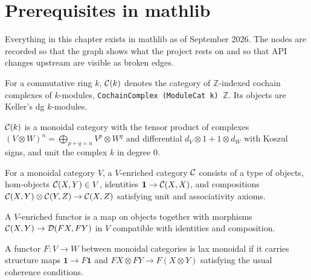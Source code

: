 \chapter{Prerequisites in mathlib}
\label{ch:prereq}

Everything in this chapter exists in mathlib as of September 2026. The nodes are recorded so
that the graph shows what the project rests on and so that API changes upstream are
visible as broken edges.

\begin{definition}
\label{def:cochain-complex}
\mathlibok
\leanok
For a commutative ring $k$, $\mathcal{C}(k)$ denotes the category of $\mathbb{Z}$-indexed cochain
complexes of $k$-modules, \texttt{CochainComplex (ModuleCat k) }$\mathbb{Z}$. Its objects are
Keller's dg $k$-modules.
\end{definition}

\begin{theorem}
\label{thm:complexes-monoidal}
\mathlibok
\leanok
{}
$\mathcal{C}(k)$ is a monoidal category with the tensor product of complexes
$(V \otimes W)^n = \bigoplus_{p+q=n} V^p \otimes W^q$ and differential
$d_V \otimes 1 + 1 \otimes d_W$ with Koszul signs, and unit the complex $k$ in degree $0$.
\end{theorem}

\begin{definition}
\label{def:enriched-category}
\mathlibok
\leanok
For a monoidal category $V$, a $V$-enriched category $\mathcal{C}$ consists of a type of objects,
hom-objects $\mathcal{C}(X,Y) \in V$, identities $\mathbf{1} \to \mathcal{C}(X,X)$, and compositions
$\mathcal{C}(X,Y) \otimes \mathcal{C}(Y,Z) \to \mathcal{C}(X,Z)$ satisfying unit and associativity axioms.
\end{definition}

\begin{definition}
\label{def:enriched-functor}
\mathlibok
\leanok
{}
A $V$-enriched functor is a map on objects together with morphisms
$\mathcal{C}(X,Y) \to \mathcal{D}(FX,FY)$ in $V$ compatible with identities and composition.
\end{definition}

\begin{definition}
\label{def:lax-monoidal}
\mathlibok
\leanok
A functor $F : V \to W$ between monoidal categories is lax monoidal if it carries
structure maps $\mathbf{1} \to F\mathbf{1}$ and $FX \otimes FY \to F(X \otimes Y)$
satisfying the usual coherence conditions.
\end{definition}

